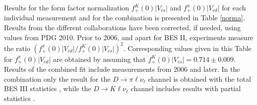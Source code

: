 
Results for the form factor normalization $f_+^K(0)|V_{cs}|$ and $f_+^{\pi}(0)|V_{cd}|$ for each individual measurement and for the combination 
is presented in Table \ref{norma}. Results from the different collaborations have been corrected, if needed, using
values from PDG 2010. Prior to 2006, and apart for BES II, experiments measure the ratio $(f_+^{\pi}(0)|V_{cd}| / f_+^K(0)|V_{cs}|)^2$. 
Corresponding values given in this Table for $f_+^{\pi}(0)|V_{cd}|$ are obtained by assuming that $f_+^K(0)|V_{cs}|=0.714\pm 0.009$.
Results of the combined fit include measurements from 2006 and later. %
In the combination only the result for the $D \to \pi \ell \nu_\ell $ channel is obtained 
with the total BES III statistics \cite{BESIII-new}, while the $D \to K \ell \nu_\ell $ 
channel includes results with partial statistics \cite{BESIII}.\;

